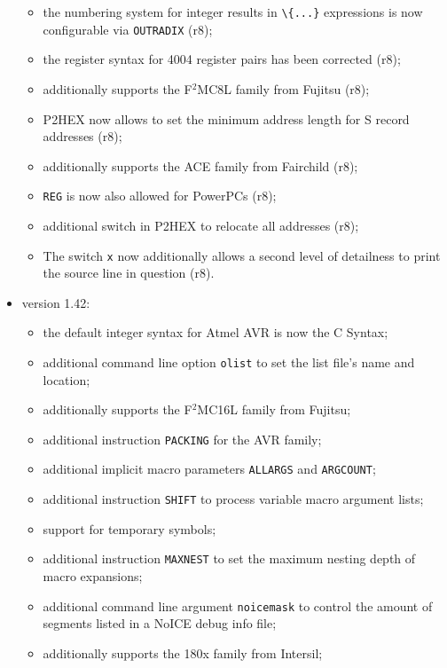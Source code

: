 \documentclass[12pt,twoside]{report}
\newcommand{\tty}[1]{{\tt #1}}
\begin{document}
\begin{itemize}
{\begin{itemize}
{            be made in C notation (r8);}
      \item{the numbering system for integer results in \verb!\{...}!
            expressions is now configurable via \tty{OUTRADIX} (r8);}
      \item{the register syntax for 4004 register pairs has been corrected
            (r8);}
      \item{additionally supports the F$^{2}$MC8L family from Fujitsu
            (r8);}
      \item{P2HEX now allows to set the minimum address length for S
            record addresses (r8);}
      \item{additionally supports the ACE family from Fairchild (r8);}
      \item{{\tt REG} is now also allowed for PowerPCs (r8);}
      \item{additional switch in P2HEX to relocate all addresses (r8);}
      \item{The switch \tty{x} now additionally allows a second level 
            of detailness to print the source line in question (r8).}
      \end{itemize}}
\item{version 1.42:
      \begin{itemize}
      \item{the default integer syntax for Atmel AVR is now the C Syntax;}
      \item{additional command line option {\tt olist} to set the
            list file's name and location;}
      \item{additionally supports the F$^{2}$MC16L family from Fujitsu;}
      \item{additional instruction {\tt PACKING} for the AVR family;}
      \item{additional implicit macro parameters {\tt ALLARGS} and 
            {\tt ARGCOUNT};}
      \item{additional instruction {\tt SHIFT} to process variable macro
            argument lists;}
      \item{support for temporary symbols;}
      \item{additional instruction {\tt MAXNEST} to set the maximum
            nesting depth of macro expansions;}
      \item{additional command line argument {\tt noicemask} to control
            the amount of segments listed in a NoICE debug info file;}
      \item{additionally supports the 180x family from Intersil;}

\end{itemize}}
\end{itemize}
\end{document}
